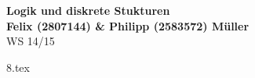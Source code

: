\documentclass[letterpaper, 12pt, a4paper]{article}
\begin{document}


	\begin{center}
	{\Large{\bfseries{Logik und diskrete Stukturen}}}\\[0.5cm]
	{\large{\bfseries{Felix (2807144) \& Philipp (2583572) Müller}}}\\[0.4cm]
	WS 14/15
	\end{center}


	{8.tex}
\end{document}
